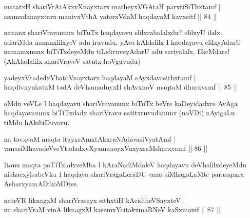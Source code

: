 
\begin{shl}
matatxH shariVrAtAkxvXnayxtarx matheyxVGAtaH parxtiSiThxtamf |\\
asamxdanayxtarx manivxVthA yaterxVdaM \footnotemark[1]{}haqdayaM kavxcitf \hfill || 84 ||
\end{shl}

\begin{artha}
nananx shariVravanunx biTuTx haqdayavu elilxrabalalxdu? elilxyU ilalx. adariMda nananxlilxyeV adu iruvudu. yAva kAldalilx I haqdayavu elilxyAdarU namamxnunx biTiTxdeyeMdu tiLidiruveyAdarU adu sariyalalx, EkeMdare! (AkAladalilx shariVraveV satutx hoVguvudu)
\end{artha}


\begin{shl}
yadeyxVtadedxVhatoV\s nayxtarx haqdayaM sAyxdavasithxtamf |\\
haqdivxyukatxM tadA deVhamaduyxH shAvxnoV maqtaM dhurxvamf \hfill || 85 ||
\end{shl}

\begin{artha}
oMdu veVLe I haqdayavu shariVravanunx biTuTx beVre kaDeyidadxre AvAga haqdayavanunx biTiTxdadx shariVravu satitxruvudanunx (noVDi) nAyigaLu tiMdu hAkibiDuvavu.
\end{artha}


\begin{shl}
na tavxyaM maqta itayxsAmxtAkxraNAdavasiVyatAmf |\\
vanasiMhavadeVveYtadadxvXyamanoyxVnayxsaMsharxyamf \hfill || 86 ||
\end{shl}

\begin{artha}%
Itanu maqta paTiTxlalxveMba I kAraNadiMdaleV haqdayavu deVhalilxdeyeMdu nishacxyisabeVku I haqdaya shariVragaLeraDU vana siMhagaLaMte parasapxra AsharxyamADikoMDive.
\end{artha}


\begin{shl}
nateVR liknagxM shariVrasayx sithxtiH kAcidiheVSayxteV |\\
na shariVraM vinA liknagxM kasemxYcitakxmaRNeV kaSxmamf \hfill || 87 ||
\end{shl}

